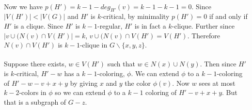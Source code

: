 \documentclass[letterpaper,12pt,oneside,onecolumn]{report}
\begin{document}
\paragraph{}
Now we have $p(H') = k-1 - deg_{H'}(v) = k-1 - k-1 = 0$. Since $|V(H')| < |V(G)|$ and $H'$ is $k$-critical, by minimality $p(H') = 0$ if and only if $H'$ is a clique. Since $H'$ is $k-1$-regular, $H'$ is in fact a $k$-clique. Further since $|v \cup (N(v) \cap V(H')| = k$, $v \cup (N(v) \cap V(H') = V(H')$. Therefore $N(v) \cap V(H')$ is $k-1$-clique in $G\backslash \{x,y,z\}$.
\paragraph{}
Suppose there exists, $w \in V(H')$ such that $w \in N(x) \cup N(y)$. Then since $H'$ is $k$-critical, $H' -w$ has a $k-1$-coloring, $\phi$. We can extend $\phi$ to a $k-1$-coloring of $H' -w - v + x + y$ by giving $x$ and $y$ the color $\phi(v)$. Now $w$ sees at most $k-2$-colors in $\phi$ so we can extend $\phi$ to a $k-1$ coloring of $H' - v + x + y$. But that is a subgraph of $G-z$. 
\end{document}
